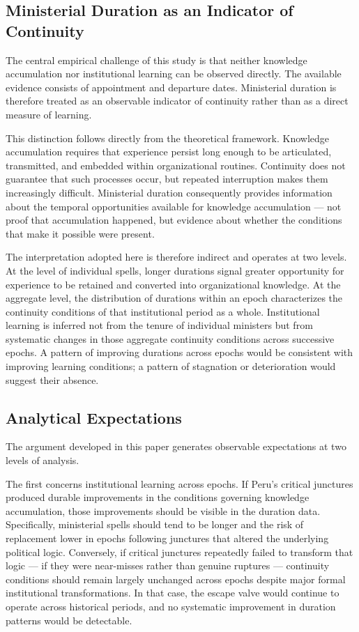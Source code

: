 \documentclass[doc, 12pt, a4paper,floatsintext]{apa7}
\begin{document}
\subsection{Ministerial Duration as an Indicator of Continuity}

The central empirical challenge of this study is that neither knowledge 
accumulation nor institutional learning can be observed directly. The 
available evidence consists of appointment and departure dates. Ministerial 
duration is therefore treated as an observable indicator of continuity 
rather than as a direct measure of learning.

This distinction follows directly from the theoretical framework. Knowledge 
accumulation requires that experience persist long enough to be articulated, 
transmitted, and embedded within organizational routines. Continuity does 
not guarantee that such processes occur, but repeated interruption makes 
them increasingly difficult. Ministerial duration consequently provides 
information about the temporal opportunities available for knowledge 
accumulation --- not proof that accumulation happened, but evidence about 
whether the conditions that make it possible were present.

The interpretation adopted here is therefore indirect and operates at two 
levels. At the level of individual spells, longer durations signal greater 
opportunity for experience to be retained and converted into organizational 
knowledge. At the aggregate level, the distribution of durations within an 
epoch characterizes the continuity conditions of that institutional period 
as a whole. Institutional learning is inferred not from the tenure of 
individual ministers but from systematic changes in those aggregate 
continuity conditions across successive epochs. A pattern of improving 
durations across epochs would be consistent with improving learning 
conditions; a pattern of stagnation or deterioration would suggest their 
absence.

\subsection{Analytical Expectations}

The argument developed in this paper generates observable expectations at 
two levels of analysis.

The first concerns institutional learning across epochs. If Peru's critical 
junctures produced durable improvements in the conditions governing 
knowledge accumulation, those improvements should be visible in the 
duration data. Specifically, ministerial spells should tend to be longer 
and the risk of replacement lower in epochs following junctures that 
altered the underlying political logic. Conversely, if critical junctures 
repeatedly failed to transform that logic --- if they were near-misses 
rather than genuine ruptures --- continuity conditions should remain 
largely unchanged across epochs despite major formal institutional 
transformations. In that case, the escape valve would continue to operate 
across historical periods, and no systematic improvement in duration 
patterns would be detectable.
\end{document}
